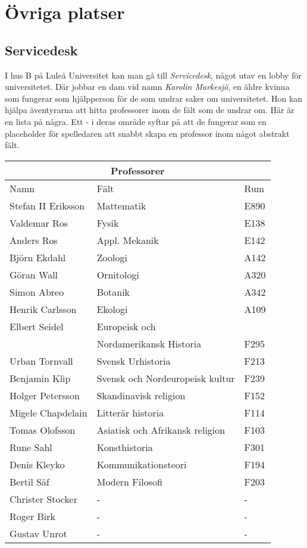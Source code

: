 \section{Övriga platser}
\subsection{Servicedesk}
\label{loc:Servicedesk}
I hus B på Luleå Universitet kan man gå till \textit{Servicedesk}, något utav en lobby för universitetet. Där jobbar en dam vid namn \textit{Karolin Markesjö}, en äldre kvinna som fungerar som hjälpperson för de som undrar saker om universitetet. Hon kan hjälpa äventyrarna att hitta professorer inom de fält som de undrar om. Här är en lista på några. Ett - i deras område syftar på att de fungerar som en placeholder för spelledaren att snabbt skapa en professor inom något abstrakt fält.

\begin{center}
	\label{tab:Professorer}
	\begin{tabular}{ | l | l | l |  }
		\hline
		\multicolumn{3}{|c|}{Professorer} \\
		\hline
		Namn & Fält & Rum \\ 
		\hline
		Stefan II Eriksson & Mattematik & E890 \\
		Valdemar Ros & Fysik & E138 \\
		Anders Ros & Appl. Mekanik & E142 \\
		Björn Ekdahl & Zoologi & A142 \\
		Göran Wall & Ornitologi & A320 \\
		Simon Abreo & Botanik & A342 \\
		Henrik Carlsson & Ekologi & A109 \\
		Elbert Seidel & Europeisk och & \\ 
		 & Nordamerikansk Historia & F295 \\
		Urban Tornvall & Svensk Urhistoria & F213 \\
		Benjamin Klip & Svensk och Nordeuropeisk kultur & F239 \\
		Holger Petersson & Skandinavisk religion & F152 \\
		Migele Chapdelain & Litterär historia & F114 \\
		Tomas Olofsson & Asiatisk och Afrikansk religion & F103 \\
		Rune Sahl & Konsthistoria & F301 \\
		Denis Kleyko & Kommunikationsteori & F194 \\
		Bertil Säf & Modern Filosofi & F203 \\
		Christer Stocker & - & - \\
		Roger Birk & - & - \\
		Gustav Unrot & - & - \\
		\hline
	\end{tabular}
\end{center}

